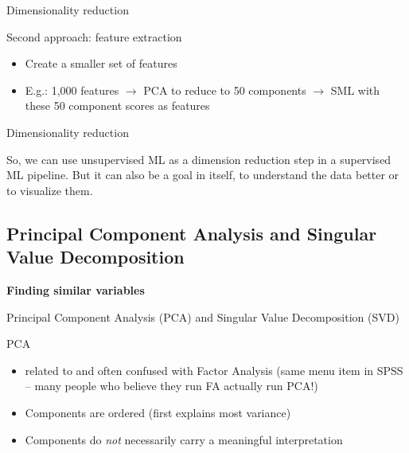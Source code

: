 \documentclass[compress]{beamer}
\begin{document}
\begin{frame}[fragile]{Dimensionality reduction}

\begin{block}{Second approach: feature extraction}
\begin{itemize}
\item Create a smaller set of features
\item E.g.: 1,000 features $\rightarrow$ PCA to reduce to 50 components $\rightarrow$ SML with these 50 component scores as features
\end{itemize}
\end{block}

\end{frame}



\begin{frame}[fragile]{Dimensionality reduction}

So, we can use unsupervised ML as a dimension reduction step in a supervised ML pipeline. 
\vspace{0.5cm}
But it can also be a goal in itself, to understand the data better or to visualize them.
\end{frame}







\subsection{Principal Component Analysis and Singular Value Decomposition}

\begin{frame}[plain]
\textbf{Finding similar variables}

Principal Component Analysis (PCA) and Singular Value Decomposition (SVD)
\end{frame}


\begin{frame}{PCA}
\begin{itemize}
\item related to and often confused with Factor Analysis (same menu item in SPSS -- many people who believe they run FA actually run PCA!)
\item Components are ordered (first explains most variance)
\item Components do \emph{not} necessarily carry a meaningful interpretation
\end{itemize}
\end{frame}
\end{document}
